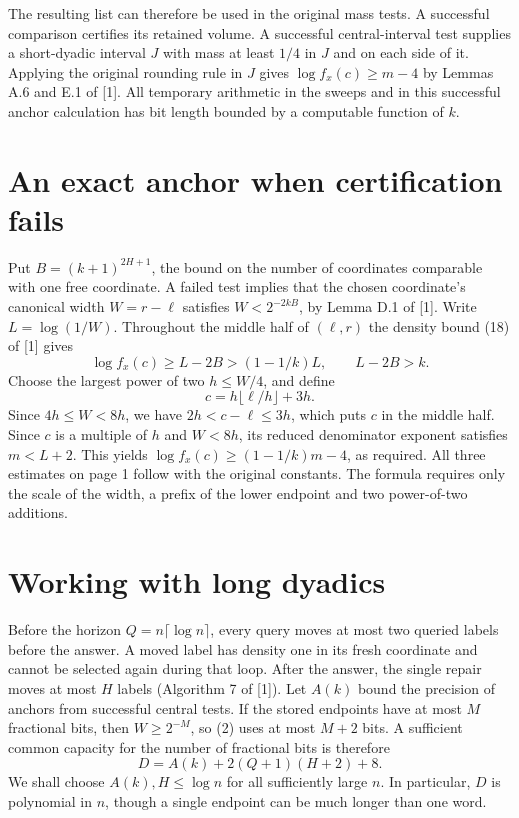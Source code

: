 \documentclass[11pt,a4paper]{article}
\begin{document}
The resulting list can therefore be used in the original mass tests. A
successful comparison certifies its retained volume. A successful central-interval
test supplies a short-dyadic interval $J$ with mass at least $1/4$ in $J$ and on
each side of it. Applying the original rounding rule in $J$ gives
$\log f_x(c)\ge m-4$ by Lemmas A.6 and E.1 of [1]. All temporary arithmetic in
the sweeps and in this successful anchor calculation has bit length bounded by a
computable function of $k$.

\section{An exact anchor when certification fails}
Put $B=(k+1)^{2H+1}$, the bound on the number of coordinates comparable with one
free coordinate. A failed test implies that the chosen coordinate's canonical
width $W=r-\ell$ satisfies $W<2^{-2kB}$, by Lemma D.1 of [1]. Write
$L=\log(1/W)$. Throughout the middle half of $(\ell,r)$ the density bound (18)
of [1] gives
\[
\log f_x(c)\ge L-2B>(1-1/k)L,\qquad L-2B>k.
\]
Choose the largest power of two $h\le W/4$, and define
\begin{equation}
c=h\lfloor\ell/h\rfloor+3h.
\end{equation}
Since $4h\le W<8h$, we have $2h<c-\ell\le3h$, which puts $c$ in the middle
half. Since $c$ is a multiple of $h$ and $W<8h$, its reduced denominator
exponent satisfies $m<L+2$. This yields $\log f_x(c)\ge(1-1/k)m-4$, as required.
All three estimates on page 1 follow with the original constants. The formula
requires only the scale of the width, a prefix of the lower endpoint and two
power-of-two additions.

\newpage
\section{Working with long dyadics}
Before the horizon $Q=n\lceil\log n\rceil$, every query moves at most two queried
labels before the answer. A moved label has density one in its fresh coordinate
and cannot be selected again during that loop. After the answer, the single
repair moves at most $H$ labels (Algorithm 7 of [1]). Let $A(k)$ bound the
precision of anchors from successful central tests. If the stored endpoints
have at most $M$ fractional bits, then $W\ge2^{-M}$, so (2) uses at most $M+2$
bits. A sufficient common capacity for the number of fractional bits is therefore
\[
D=A(k)+2(Q+1)(H+2)+8.
\]
We shall choose $A(k),H\le\log n$ for all sufficiently large $n$. In particular,
$D$ is polynomial in $n$, though a single endpoint can be much longer than one word.
\end{document}
